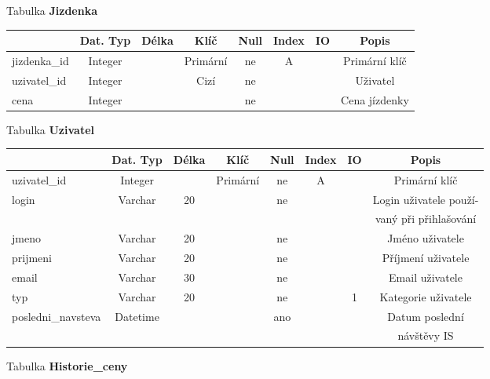 \documentclass[11pt]{article}
\begin{document}
\noindent
Tabulka \textbf{Jizdenka}

\begin{table}[H]
    \begin{tabular}{|l|c|c|c|c|c|c|c|} \hline
                            & Dat. Typ  & Délka & Klíč      & Null  & Index & IO    & Popis \\ \hline
        jizdenka\_id	    & Integer	&	    & Primární	& ne	& A		&       & Primární klíč \\ \hline
        uzivatel\_id	    & Integer	&	    & Cizí	    & ne	&		&       & Uživatel \\ \hline
        cena	            & Integer	&	    & 	        & ne	&		&       & Cena jízdenky \\ \hline
    \end{tabular}
\end{table}

\newpage

\noindent
Tabulka \textbf{Uzivatel}

\begin{table}[H]
    \begin{tabular}{|l|c|c|c|c|c|c|c|} \hline
                            & Dat. Typ  & Délka & Klíč      & Null  & Index & IO    & Popis \\ \hline
        uzivatel\_id	    & Integer	&	    & Primární	& ne	& A		&       & Primární klíč \\ \hline
        login	            & Varchar	& 20	& 	        & ne	&	    & 	    & Login uživatele použí-\\ &&&&&&& vaný při přihlašování \\ \hline
        jmeno	            & Varchar	& 20	& 	        & ne	&	    & 	    & Jméno uživatele \\ \hline
        prijmeni	        & Varchar	& 20	& 	        & ne	&	    & 	    & Příjmení uživatele \\ \hline
        email	            & Varchar	& 30	& 	        & ne	&	    & 	    & Email uživatele \\ \hline
        typ	                & Varchar	& 20	& 	        & ne	&	    & 1     & Kategorie uživatele \\ \hline
        posledni\_navsteva	& Datetime	& 		&           & ano	&		&       & Datum poslední\\ &&&&&&& návštěvy IS \\ \hline
    \end{tabular}
\end{table}

\noindent
Tabulka \textbf{Historie\_ceny}
\end{document}
